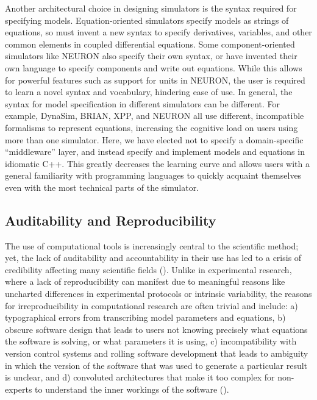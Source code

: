 \documentclass{frontiersSCNS} %
\begin{document}
Another architectural choice in designing simulators is the syntax required for specifying models. Equation-oriented simulators specify models as strings of equations, so must invent a new syntax to specify derivatives, variables, and other common elements in coupled differential equations. Some component-oriented simulators like NEURON also specify their own syntax, or have invented their own language to specify components and write out equations. While this allows for powerful features such as support for units in NEURON, the user is required to learn a novel syntax and vocabulary, hindering ease of use. In general, the syntax for model specification in different simulators can be different. For example, DynaSim, BRIAN, XPP, and NEURON all use different, incompatible formalisms to represent equations, increasing the cognitive load on users using more than one simulator. Here, we have elected not to specify a domain-specific ``middleware'' layer, and instead specify and implement models and equations in idiomatic C++. This greatly decreases the learning curve and allows users with a general familiarity with programming languages to quickly acquaint themselves even with the most technical parts of the simulator. 

\subsection{Auditability and Reproducibility}

The use of computational tools is increasingly central to the scientific method; yet, the lack of auditability and accountability in their use has led to a crisis of credibility affecting many scientific fields (\cite{stoddenEnhancingReproducibilityComputational2016, bakerWhyScientistsMust2016}). Unlike in experimental research, where a lack of reproducibility can manifest due to meaningful reasons like uncharted differences in experimental protocols or intrinsic variability, the reasons for irreproducibility in computational research are often trivial and include: a) typographical errors from transcribing model parameters and equations, b) obscure software design that leads to users not knowing precisely what equations the software is solving, or what parameters it is using, c) incompatibility with version control systems and rolling software development that leads to ambiguity in which the version of the software that was used to generate a particular result is unclear, and d) convoluted architectures that make it too complex for non-experts to understand the inner workings of the software (\cite{xuMeasurementSourceCode2017, sedanoCodeReadabilityTesting2016, vikstromStudyAutomaticTranslation2009}).
\end{document}
